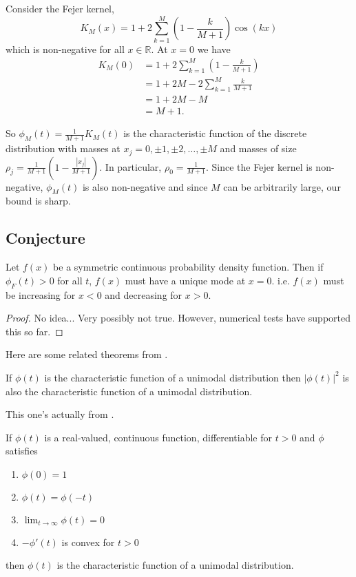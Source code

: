 Consider the Fejer kernel,
$$K_M(x) = 1 + 2\sum_{k=1}^M \left(1 - \frac{k}{M + 1} \right) \cos(kx)$$
which is non-negative for all $x \in \mathbb{R}$. At $x = 0$ we have
\begin{align*}
K_M(0) &= 1 + 2\sum_{k=1}^M \left(1 - \frac{k}{M + 1} \right)\\
&=1 + 2 M - 2\sum_{k=1}^M \frac{k}{M + 1}\\
&= 1 + 2M - M\\
&= M+1.
\end{align*}

So $\phi_M(t) = \frac{1}{M+1} K_M(t)$ is the characteristic function of the discrete distribution with masses at $x_j = 0, \pm 1, \pm 2, \dots, \pm M$ and masses of size $\rho_j = \frac{1}{M+1}\left(1 - \frac{|x_j|}{M+1} \right)$. In particular, $\rho_0 = \frac{1}{M+1}$. Since the Fejer kernel is non-negative, $\phi_M(t)$ is also non-negative and since $M$ can be arbitrarily large, our bound is sharp.

\subsection{Conjecture}
\begin{conjecture}
	Let $f(x)$ be a symmetric continuous probability density function. Then if $\phi_F(t) > 0$ for all $t$, $f(x)$ must have a unique mode at $x = 0$.
	i.e.
	$f(x)$ must be increasing for $x < 0$ and decreasing for $x > 0$.
\end{conjecture}
\begin{proof}
	No idea... Very possibly not true. However, numerical tests have supported this so far.
\end{proof}

Here are some related theorems from \cite{Ushakov1999-rn}.

\begin{theorem}
	If $\phi(t)$ is the characteristic function of a unimodal distribution then $|\phi(t)|^2$ is also the characteristic function of a unimodal distribution.
\end{theorem}

This one's actually from \cite{Askey1975-ft}.
\begin{theorem}
	If $\phi(t)$ is a real-valued, continuous function, differentiable for $t>0$ and $\phi$ satisfies
	\begin{enumerate}
		\item $\phi(0) = 1$
		\item $\phi(t) = \phi(-t)$
		\item $\lim_{t\rightarrow \infty} \phi(t) = 0$
		\item $-\phi'(t)$ is convex for $t>0$
	\end{enumerate}
	then $\phi(t)$ is the characteristic function of a unimodal distribution.
	\label{thm:sufficientforunimodal}
\end{theorem}

